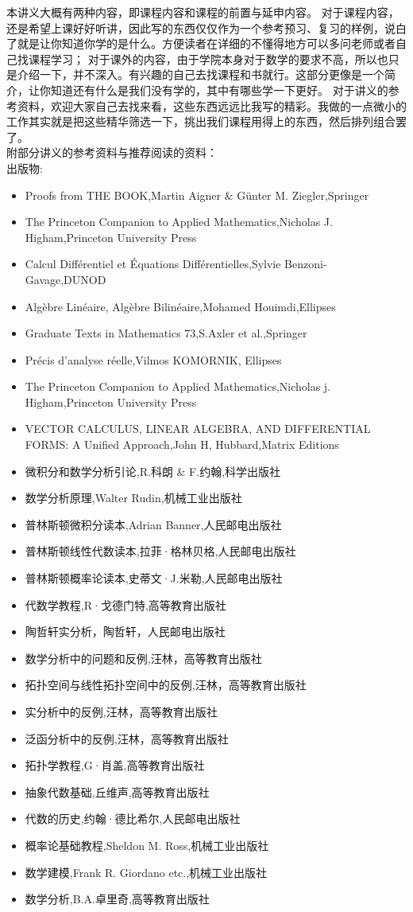\documentclass[12pt, a4paper, oneside]{ctexbook}
\begin{document}
本讲义大概有两种内容，即课程内容和课程的前置与延申内容。
对于课程内容，还是希望上课好好听讲，因此写的东西仅仅作为一个参考预习、复习的样例，说白了就是让你知道你学的是什么。方便读者在详细的不懂得地方可以多问老师或者自己找课程学习；
对于课外的内容，由于学院本身对于数学的要求不高，所以也只是介绍一下，并不深入。有兴趣的自己去找课程和书就行。这部分更像是一个简介，让你知道还有什么是我们没有学的，其中有哪些学一下更好。
对于讲义的参考资料，欢迎大家自己去找来看，这些东西远远比我写的精彩。我做的一点微小的工作其实就是把这些精华筛选一下，挑出我们课程用得上的东西，然后排列组合罢了。\\

\noindent
附部分讲义的参考资料与推荐阅读的资料：\\
出版物:
\begin{itemize}
  \item Proofs from THE BOOK,Martin Aigner \& Günter M. Ziegler,Springer
  \item The Princeton Companion to Applied Mathematics,Nicholas J. Higham,Princeton University Press
  \item Calcul Différentiel et Équations Différentielles,Sylvie Benzoni-Gavage,DUNOD
  \item Algèbre Linéaire, Algèbre Bilinéaire,Mohamed Houimdi,Ellipses
  \item Graduate Texts in Mathematics 73,S.Axler et al.,Springer
  \item Précis d'analyse réelle,Vilmos KOMORNIK, Ellipses
  \item The Princeton Companion to Applied Mathematics,Nicholas j. Higham,Princeton University Press
  \item VECTOR CALCULUS, LINEAR ALGEBRA, AND DIFFERENTIAL FORMS: A Unified Approach,John H, Hubbard,Matrix Editions
  \item 微积分和数学分析引论,R.科朗 \& F.约翰,科学出版社
  \item 数学分析原理,Walter Rudin,机械工业出版社
  \item 普林斯顿微积分读本,Adrian Banner,人民邮电出版社
  \item 普林斯顿线性代数读本,拉菲·格林贝格,人民邮电出版社
  \item 普林斯顿概率论读本,史蒂文·J.米勒,人民邮电出版社
  \item 代数学教程,R·戈德门特,高等教育出版社
  \item 陶哲轩实分析，陶哲轩，人民邮电出版社
  \item 数学分析中的问题和反例,汪林，高等教育出版社
  \item 拓扑空间与线性拓扑空间中的反例,汪林，高等教育出版社
  \item 实分析中的反例,汪林，高等教育出版社
  \item 泛函分析中的反例,汪林，高等教育出版社
  \item 拓扑学教程,G·肖盖,高等教育出版社
  \item 抽象代数基础,丘维声,高等教育出版社
  \item 代数的历史,约翰·德比希尔,人民邮电出版社
  \item 概率论基础教程,Sheldon M. Ross,机械工业出版社
  \item 数学建模,Frank R. Giordano etc.,机械工业出版社
  \item 数学分析,B.A.卓里奇,高等教育出版社
\end{itemize}
\end{document}
